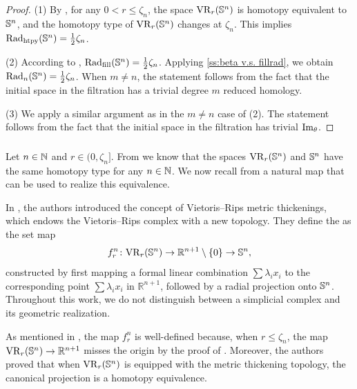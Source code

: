 \begin{proof}
	(1) By \cite[Theorem~7.1]{lim2024vietoris}, for any $0 < r \leq \zeta_n$, the space $\mathrm{VR}_r(\mathbb{S}^n)$ is homotopy equivalent to $\mathbb{S}^n$, and the homotopy type of $\mathrm{VR}_r(\mathbb{S}^n)$ changes at $\zeta_n$.
	This implies $\mathrm{Rad}_{\mathrm{htpy}}(\mathbb{S}^n)=\frac{1}{2}\zeta_n$.

	\smallskip (2) According to \cite{katz1983filling}, \(\mathrm{Rad}_{\mathrm{fill}}(\mathbb{S}^n) = \frac{1}{2}\zeta_n\).
	Applying \cref{ss:beta v.s. fillrad}, we obtain \(\mathrm{Rad}_{n}(\mathbb{S}^n) = \frac{1}{2}\zeta_n\).
	When $m\neq n$, the statement follows from the fact that the initial space in the filtration has a trivial degree $m$ reduced homology.

	\smallskip (3) We apply a similar argument as in the $m\neq n$ case of (2). The statement follows from the fact that the initial space in the filtration has trivial $\operatorname{Im}_\theta$.
\end{proof}

\subsubsection{}\label{ss:VRSn projection}

Let \(n \in \mathbb{N}\) and \(r \in (0, \zeta_n]\).
From \cite[Theorem~7.1]{lim2024vietoris} we know that the spaces \(\mathrm{VR}_r(\mathbb{S}^n)\) and \(\mathbb{S}^n\) have the same homotopy type for any \(n \in \mathbb{N}\).
We now recall from \cite{adamaszek2018metric} a natural map that can be used to realize this equivalence.

In \cite{adamaszek2018metric}, the authors introduced the concept of Vietoris–Rips metric thickenings, which endows the Vietoris–Rips complex with a new topology.
They define the  as the set map
\[
f_r^n \colon \mathrm{VR}_r(\mathbb{S}^n) \to \mathbb{R}^{n+1} \setminus \{0\} \to \mathbb{S}^n,
\]
constructed by first mapping a formal linear combination \(\sum \lambda_i x_i\) to the corresponding point \(\sum \lambda_i x_i\) in \(\mathbb{R}^{n+1}\), followed by a radial projection onto \(\mathbb{S}^n\).
Throughout this work, we do not distinguish between a simplicial complex and its geometric realization.

As mentioned in \cite{adamaszek2018metric}, the map $f_r^n$ is well-defined because, when $r \leq \zeta_n$, the map $\mathrm{VR}_r(\mathbb{S}^n) \to \mathbb{R}^{n+1}$ misses the origin by the proof of \cite[Lemma 3]{lovasz1983self}.
Moreover, the authors proved that when \(\mathrm{VR}_r(\mathbb{S}^n)\) is equipped with the metric thickening topology, the canonical projection is a homotopy equivalence.

